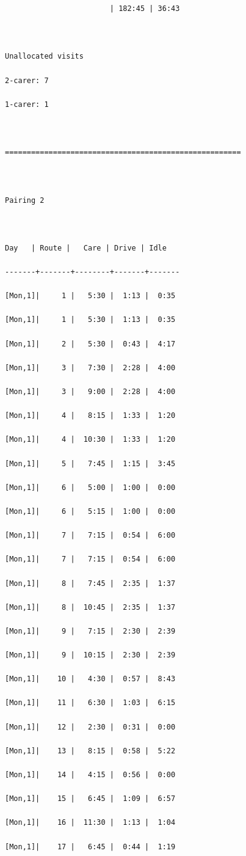 \documentclass[11pt,twoside]{article}
\numberwithin{Theorem}{section}
\numberwithin{Definition}{section}
\numberwithin{Lemma}{section}
\numberwithin{Algorithm}{section}
\numberwithin{equation}{section}
\begin{document}
\begin{verbatim}
                        | 182:45 | 36:43

 

Unallocated visits

2-carer: 7

1-carer: 1

 

======================================================

 

Pairing 2

 

Day   | Route |   Care | Drive | Idle

-------+-------+--------+-------+-------

[Mon,1]|     1 |   5:30 |  1:13 |  0:35

[Mon,1]|     1 |   5:30 |  1:13 |  0:35

[Mon,1]|     2 |   5:30 |  0:43 |  4:17

[Mon,1]|     3 |   7:30 |  2:28 |  4:00

[Mon,1]|     3 |   9:00 |  2:28 |  4:00

[Mon,1]|     4 |   8:15 |  1:33 |  1:20

[Mon,1]|     4 |  10:30 |  1:33 |  1:20

[Mon,1]|     5 |   7:45 |  1:15 |  3:45

[Mon,1]|     6 |   5:00 |  1:00 |  0:00

[Mon,1]|     6 |   5:15 |  1:00 |  0:00

[Mon,1]|     7 |   7:15 |  0:54 |  6:00

[Mon,1]|     7 |   7:15 |  0:54 |  6:00

[Mon,1]|     8 |   7:45 |  2:35 |  1:37

[Mon,1]|     8 |  10:45 |  2:35 |  1:37

[Mon,1]|     9 |   7:15 |  2:30 |  2:39

[Mon,1]|     9 |  10:15 |  2:30 |  2:39

[Mon,1]|    10 |   4:30 |  0:57 |  8:43

[Mon,1]|    11 |   6:30 |  1:03 |  6:15

[Mon,1]|    12 |   2:30 |  0:31 |  0:00

[Mon,1]|    13 |   8:15 |  0:58 |  5:22

[Mon,1]|    14 |   4:15 |  0:56 |  0:00

[Mon,1]|    15 |   6:45 |  1:09 |  6:57

[Mon,1]|    16 |  11:30 |  1:13 |  1:04

[Mon,1]|    17 |   6:45 |  0:44 |  1:19


\end{verbatim}
\end{document}
